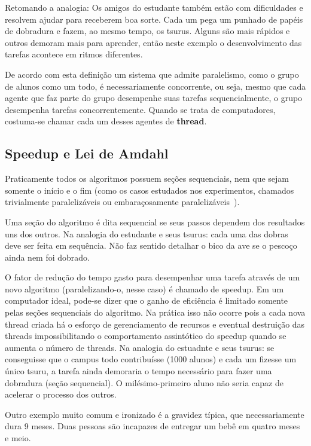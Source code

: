 \documentclass[12pt,a4paper]{article}
\begin{document}
Retomando a analogia: Os amigos do estudante também estão com dificuldades e resolvem ajudar para receberem boa sorte. Cada um pega um punhado de papéis de dobradura e fazem, ao mesmo tempo, os tsurus. Alguns são mais rápidos e outros demoram mais para aprender, então neste exemplo o desenvolvimento das tarefas acontece em ritmos diferentes.

De acordo com esta definição um sistema que admite paralelismo, como o grupo de alunos como um todo, é necessariamente concorrente, ou seja, mesmo que cada agente que faz parte do grupo desempenhe suas tarefas sequencialmente, o grupo desempenha tarefas concorrentemente. Quando se trata de computadores, costuma-se chamar cada um desses agentes de \textbf{thread}.

\subsection{Speedup e Lei de Amdahl}
\label{ssec:lei de amdahl}

 Praticamente todos os algoritmos possuem seções sequenciais, nem que sejam somente o início e o fim (como os casos estudados nos experimentos, chamados trivialmente paralelizáveis ou embaraçosamente paralelizáveis~\cite{pacheco11}).

Uma seção do algoritmo é dita sequencial se seus passos dependem dos resultados uns dos outros. Na analogia do estudante e seus tsurus: cada uma das dobras deve ser feita em sequência. Não faz sentido detalhar o bico da ave se o pescoço ainda nem foi dobrado.

O fator de redução do tempo gasto para desempenhar uma tarefa através de um novo algoritmo (paralelizando-o, nesse caso) é chamado de speedup. Em um computador ideal, pode-se dizer que o ganho de eficiência é limitado somente pelas seções sequenciais do algoritmo. Na prática isso não ocorre pois a cada nova thread criada há o esforço de gerenciamento de recursos e eventual destruição das threads impossibilitando o comportamento assintótico do speedup quando se aumenta o número de threads. Na analogia do estuadnte e seus tsurus: se conseguisse que o campus todo contribuísse (1000 alunos) e cada um fizesse um único tsuru, a tarefa ainda demoraria o tempo necessário para fazer uma dobradura (seção sequencial). O milésimo-primeiro aluno não seria capaz de acelerar o processo dos outros.

Outro exemplo muito comum e ironizado é a gravidez típica, que necessariamente dura 9 meses. Duas pessoas são incapazes de entregar um bebê em quatro meses e meio.
\end{document}
